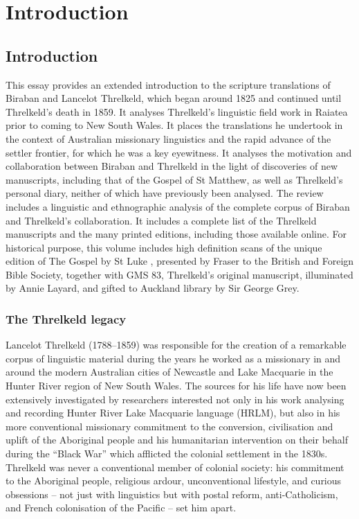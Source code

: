 \part{Introduction}
\chapter{Introduction}

This essay provides an extended introduction to the scripture translations of Biraban and Lancelot Threlkeld, which began around 1825 and continued until Threlkeld's death in 1859. It analyses Threlkeld’s linguistic field work in Raiatea prior to coming to New South Wales. It places the translations he undertook in the context of Australian missionary linguistics and the rapid advance of the settler frontier, for which he was a key eyewitness. It analyses the motivation and collaboration between Biraban and Threlkeld in the light of discoveries of new manuscripts, including that of the Gospel of St Matthew, as well as Threlkeld’s personal diary, neither of which have previously been analysed. The review includes a linguistic and ethnographic analysis of the complete corpus of Biraban and Threlkeld’s collaboration. It includes a complete list of the Threlkeld manuscripts and the many printed editions, including those available online. For historical purpose, this volume includes high definition scans of the unique edition of The Gospel by St Luke \citep{fraser_gospel_1891}, presented by Fraser to the British and Foreign Bible Society, together with GMS 83, Threlkeld’s original manuscript, illuminated by Annie Layard, and gifted to Auckland library by Sir George Grey.

\section{The Threlkeld legacy}

Lancelot Threlkeld (1788--1859) was responsible for the creation of a remarkable corpus of linguistic material during the years he worked as a missionary in and around the modern Australian cities of Newcastle and Lake Macquarie in the Hunter River region of New South Wales. The sources for his life have now been extensively investigated by researchers interested not only in his work analysing and recording Hunter River Lake Macquarie language (HRLM), but also in his more conventional missionary commitment to the conversion, civilisation and uplift of the Aboriginal people and his humanitarian intervention on their behalf during the “Black War” which afflicted the colonial settlement in the 1830s. Threlkeld was never a conventional member of colonial society: his commitment to the Aboriginal people, religious ardour, unconventional lifestyle, and curious obsessions -- not just with linguistics but with postal reform, anti-Catholicism, and French colonisation of the Pacific -- set him apart.

